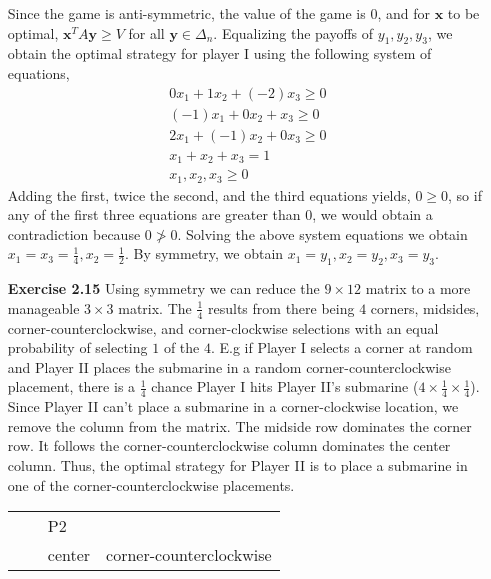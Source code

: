 \documentclass[10pt]{article}[H]
\begin{document}
\begin{itemize}
\begin{table}[H]
\begin{tabular}{lllll}
    \end{tabular}
    \end{table}
    Since the game is anti-symmetric, the value of the game is $0$, and for $\mathbf{x}$ to be optimal, $\mathbf{x}^T A\mathbf{y}\ge V$ for all $\mathbf{y}\in\Delta_n$. Equalizing the payoffs of $y_1,y_2,y_3$, we obtain the optimal strategy for player I using the following system of equations,
    \begin{align*}
       0x_1+1x_2+(-2)x_3\ge0\\
       (-1)x_1+0x_2+x_3\ge0\\
       2x_1+(-1)x_2+0x_3\ge0\\
       x_1+x_2+x_3=1\\
       x_1,x_2,x_3\ge0
    \end{align*}
    Adding the first, twice the second, and the third equations yields, $0\ge0$, so if any of the first three equations are greater than $0$, we would obtain a contradiction because $0\ngtr0$. Solving the above system equations we obtain $x_1=x_3=\frac{1}{4},x_2=\frac{1}{2}$. By symmetry, we obtain $x_1=y_1,x_2=y_2,x_3=y_3$.
    \item [\textbf{Exercise 2.15}] Using symmetry we can reduce the $9\times12$ matrix to a more manageable $3\times3$ matrix. 
    The $\frac{1}{4}$ results from there being $4$ corners, midsides, corner-counterclockwise, and corner-clockwise selections with an equal probability of selecting $1$ of the $4$. 
    E.g if Player I selects a corner at random and Player II places the submarine in a random corner-counterclockwise placement, there is a $\frac{1}{4}$ chance Player I hits Player II's submarine ($4\times\frac{1}{4}\times\frac{1}{4}$).
    Since Player II can't place a submarine in a corner-clockwise location, we remove the column from the matrix. The midside row dominates the corner row. It follows the corner-counterclockwise column dominates the center column. Thus, the optimal strategy for Player II is to place a submarine in one of the corner-counterclockwise placements. 
    \begin{table}[H]
    \begin{tabular}{llll}
                                                                                        &                              & P2                          &                                              \\ \cline{2-4} 
    \multicolumn{1}{l|}{}                                                               & \multicolumn{1}{l|}{}        & \multicolumn{1}{l|}{center} & \multicolumn{1}{l|}{corner-counterclockwise} \\ \cline{2-4} 

\end{tabular}
\end{table}
\end{itemize}
\end{document}
